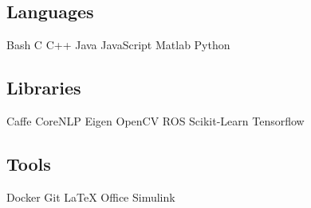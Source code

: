 \documentclass[letterpaper]{soragna-onepage-twocols} %
\begin{document}
\begin{minipage}[t]{0.3\textwidth}
\subsection{Languages}

Bash \textbullet{} C \textbullet{} C++ \textbullet{} Java \textbullet{}  JavaScript \textbullet{} Matlab \textbullet{} Python \\


\subsection{Libraries}

Caffe \textbullet{} CoreNLP \textbullet{} Eigen \textbullet{} OpenCV \textbullet{} ROS \textbullet{}  Scikit-Learn \textbullet{} Tensorflow \\

\subsection{Tools}

Docker \textbullet{} Git \textbullet{} LaTeX \textbullet{} Office \textbullet{} Simulink \\

\sectionspace %


\end{minipage} %
\hfill
%
%
\end{document}
